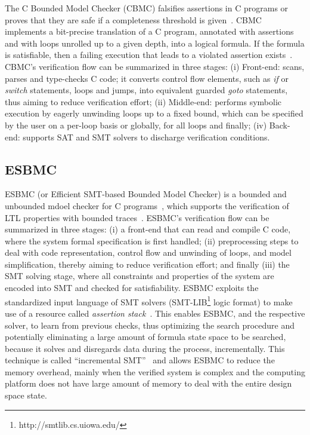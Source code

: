 \documentclass[review]{elsarticle}
\begin{document}
The C Bounded Model Checker (CBMC) falsifies assertions in C programs or proves that they are safe if a completeness threshold is given~\cite{Kroening}. CBMC implements a bit-precise translation of a C program, annotated with assertions and with loops unrolled up to a given depth, into a logical formula. If the formula is satisfiable, then a failing execution that leads to a violated assertion exists~\cite{Kroening}. CBMC's verification flow can be summarized in three stages: (i) Front-end: scans, parses and type-checks C code; it converts control flow elements, such as \textit{if} or \textit{switch} statements, loops and jumps, into equivalent guarded \textit{goto} statements, thus aiming to reduce verification effort; (ii) Middle-end: performs symbolic execution by eagerly unwinding loops up to a fixed bound, which can be specified by the user on a per-loop basis or globally, for all loops and finally; (iv) Back-end: supports SAT and SMT solvers to discharge verification conditions.

\subsection{ESBMC}

ESBMC (or Efficient SMT-based Bounded Model Checker) is a bounded and unbounded mdoel checker for C programs~\cite{esbmc2018}, which supports the verification of LTL properties with bounded traces~\cite{DBLP:journals/sosym/MorseCN015}. ESBMC's verification flow can be summarized in three stages: (i) a front-end that can read and compile C code, where the system formal specification is first handled; (ii) preprocessing steps to deal with code representation, control flow and unwinding of loops, and model simplification, thereby aiming to reduce verification effort; and finally (iii) the SMT solving stage, where all constraints and properties of the system are encoded into SMT and checked for satisfiability. ESBMC exploits the standardized input language of SMT solvers (SMT-LIB\footnote{http://smtlib.cs.uiowa.edu/} logic format) to make use of a resource called \textit{assertion stack}~\cite{Morse2015}. This enables ESBMC, and the respective solver, to learn from previous checks, thus optimizing the search procedure and potentially eliminating a large amount of formula state space to be searched, because it solves and disregards data during the process, incrementally. This technique is called ``incremental SMT''~\cite{DBLP:journals/fac/SchrammelKBMTB17} and allows ESBMC to reduce the memory overhead, mainly when the verified system is complex and the computing platform does not have large amount of memory to deal with the entire design space state.
%
\end{document}
